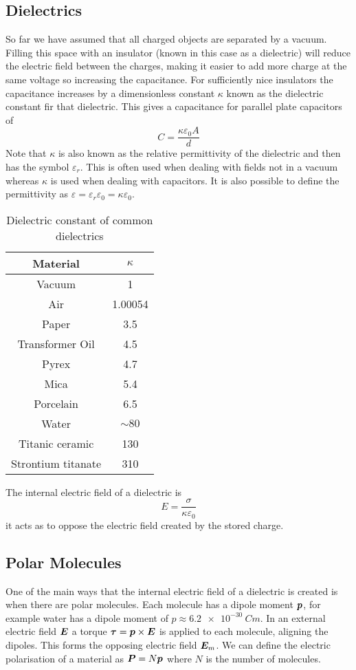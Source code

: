 \documentclass{article}
\begin{document}
    \subsection{Dielectrics}
    So far we have assumed that all charged objects are separated by a vacuum.
    Filling this space with an insulator (known in this case as a dielectric) will reduce the electric field between the charges, making it easier to add more charge at the same voltage so increasing the capacitance.
    For sufficiently nice insulators the capacitance increases by a dimensionless constant \(\kappa\) known as the dielectric constant fir that dielectric.
    This gives a capacitance for parallel plate capacitors of
    \[C = \frac{\kappa \varepsilon_0 A}{d}\]
    Note that \(\kappa\)  is also known as the relative permittivity of the dielectric and then has the symbol \(\varepsilon_r\).
    This is often used when dealing with fields not in a vacuum whereas \(\kappa\) is used when dealing with capacitors.
    It is also possible to define the permittivity as \(\varepsilon = \varepsilon_r\varepsilon_0 = \kappa\varepsilon_0\).
    \begin{table}[ht]
        \centering
        \begin{tabular}{c|c}\hline
            Material & \(\kappa\)\\\hline
            Vacuum & 1\\
            Air & 1.00054\\
            Paper & 3.5\\
            Transformer Oil & 4.5\\
            Pyrex & 4.7\\
            Mica & 5.4\\
            Porcelain & 6.5\\
            Water & \(\sim 80\)\\
            Titanic ceramic & 130\\
            Strontium titanate & 310\\\hline
        \end{tabular}
        \caption{Dielectric constant of common dielectrics}
    \end{table}
    The internal electric field of a dielectric is
    \[E = \frac{\sigma}{\kappa\varepsilon_0}\]
    it acts as to oppose the electric field created by the stored charge.
    
    \subsection{Polar Molecules}
    One of the main ways that the internal electric field of a dielectric is created is when there are polar molecules.
    Each molecule has a dipole moment \(\bm{p}\), for example water has a dipole moment of \(p \approx \SI{6.2e-30}{Cm}\).
    In an external electric field \(\bm{E}\) a torque \(\bm{\tau} = \bm{p}\times\bm{E}\) is applied to each molecule, aligning the dipoles.
    This forms the opposing electric field \(\bm{E}_m\).
    We can define the electric polarisation of a material as \(\bm{P} = N\bm{p}\) where \(N\) is the number of molecules.
    
\end{document}
